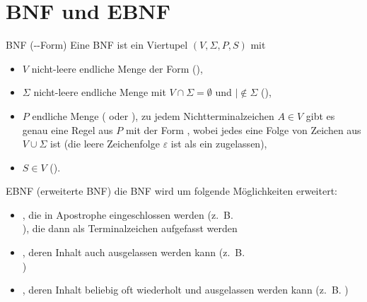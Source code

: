 \section{%
    BNF und EBNF%
}

\begin{Def}{BNF (--Form)}
    Eine BNF ist ein Viertupel $(V, \Sigma, P, S)$ mit
    \begin{itemize}
        \item $V$ nicht-leere endliche Menge der Form 
        (),

        \item $\Sigma$ nicht-leere endliche Menge mit
        $V \cap \Sigma = \emptyset$ und $| \notin \Sigma$
        (),

        \item $P$ endliche Menge ( oder
        ), zu jedem Nichtterminalzeichen $A \in V$ gibt
        es genau eine Regel aus $P$ mit der Form
        , wobei jedes  eine
        Folge von Zeichen aus $V \cup \Sigma$ ist
        (die leere Zeichenfolge $\varepsilon$ ist als ein 
        zugelassen),

        \item $S \in V$ ().
    \end{itemize}
\end{Def}

\begin{Def}{EBNF (erweiterte BNF)}
    die BNF wird um folgende Möglichkeiten erweitert:
    \begin{itemize}
        \item {}, die in Apostrophe
        eingeschlossen werden (z.~B. \\
        ), die dann als
        Terminalzeichen aufgefasst werden

        \item {}, deren Inhalt auch
        ausgelassen werden kann (z.~B. \\
        )

        \item {}, deren Inhalt
        beliebig oft wiederholt und ausgelassen werden kann (z.~B.
        )
    \end{itemize}
\end{Def}

